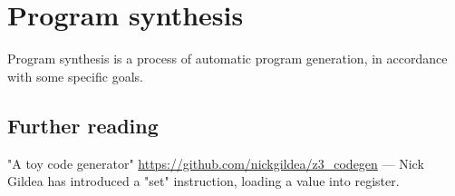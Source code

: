 \section{Program synthesis}

Program synthesis is a process of automatic program generation, in accordance with some specific goals.







\subsection{Further reading}

"A toy code generator" \url{https://github.com/nickgildea/z3_codegen} --- Nick Gildea has introduced a "set" instruction,
loading a value into register.

